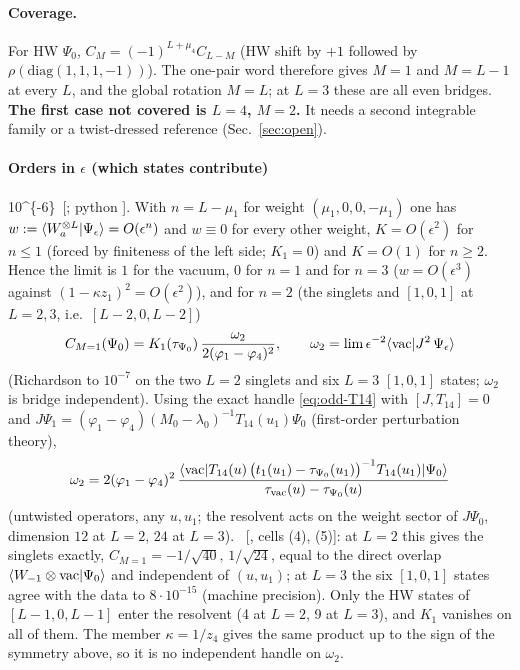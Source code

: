 \paragraph{Coverage.} For HW $\Psi_0$, $C_M=(-1)^{L+\mu_4}C_{L-M}$ (HW shift by $+1$ followed by $\rho(\mathrm{diag}(1,1,1,-1))$). The one-pair word therefore gives $M=1$ and $M=L-1$ at every $L$, and the global rotation $M=L$; at $L=3$ these are all
even bridges. \textbf{The first case not covered is $L=4$, $M=2$.} It needs a second integrable family or a twist-dressed reference (Sec.~\ref{sec:open}).

\paragraph{Orders in $\epsilon$ (which states contribute)} \num{10^{-6}}\ [; python ]. With $n=L-\mu_1$ for weight $(\mu_1,0,0,-\mu_1)$ one has $w:=\langle W_a^{\otimes L}|\Psi_\epsilon\rangle=O(\epsilon^n)$ and $w\equiv0$ for every other weight,
$K=O(\epsilon^2)$ for $n\le1$ (forced by finiteness of the left side; $K_1=0$) and $K=O(1)$ for $n\ge2$. Hence the limit is $1$ for the vacuum, $0$ for $n=1$ and for $n=3$ ($w=O(\epsilon^3)$ against $(1-\kappa z_1)^2=O(\epsilon^2)$), and
for $n=2$ (the singlets and $[1,0,1]$ at $L=2,3$, i.e.\ $[L-2,0,L-2]$)
\begin{equation}\label{eq:kappa-C1}
 C_{M=1}(\Psi_0)=K_1(\tau_{\Psi_0})\,\frac{\omega_2}{2(\varphi_1-\varphi_4)^2},\qquad \omega_2=\lim\epsilon^{-2}\langle\mathrm{vac}|J^2\,\Psi_\epsilon\rangle
\end{equation}
(Richardson to $10^{-7}$ on the two $L=2$ singlets and six $L=3$ $[1,0,1]$ states; $\omega_2$ is bridge independent). Using the exact handle \eqref{eq:odd-T14} with $[J,T_{14}]=0$ and $J\Psi_1=(\varphi_1-\varphi_4)(M_0-\lambda_0)^{-1}T_{14}(u_1)\Psi_0$ (first-order perturbation theory),
\begin{equation}\label{eq:kappa-omega2}
 \omega_2=2(\varphi_1-\varphi_4)^2\,\frac{\langle\mathrm{vac}|T_{14}(u)\,\big(t_1(u_1)-\tau_{\Psi_0}(u_1)\big)^{-1}T_{14}(u_1)|\Psi_0\rangle}{\tau_{\rm vac}(u)-\tau_{\Psi_0}(u)}
\end{equation}
(untwisted operators, any $u,u_1$; the resolvent acts on the weight sector of $J\Psi_0$, dimension $12$ at $L=2$, $24$ at $L=3$). \ex\ [, cells (4), (5)]: at $L=2$ this gives the singlets exactly, $C_{M=1}=-1/\sqrt{40},\,1/\sqrt{24}$, equal to the direct overlap $\langle W_{-1}\otimes\mathrm{vac}|\Psi_0\rangle$ and independent of $(u,u_1)$;
at $L=3$ the six $[1,0,1]$ states agree with the data to $8\cdot10^{-15}$ (machine precision). Only the HW states of $[L-1,0,L-1]$ enter the resolvent (4 at $L=2$, 9 at $L=3$), and $K_1$ vanishes on all of them. The member $\kappa=1/z_4$ gives the same product up to the sign of the symmetry above, so it is no independent handle on $\omega_2$.

